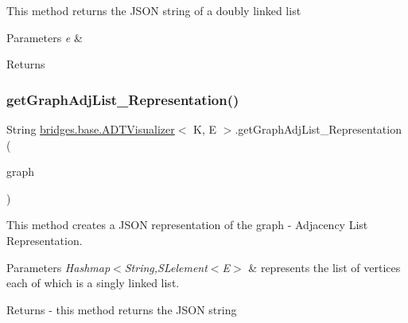 This method returns the J\+S\+ON string of a doubly linked list 
\begin{DoxyParams}{Parameters}
{\em e} & \\
\hline
\end{DoxyParams}
\begin{DoxyReturn}{Returns}

\end{DoxyReturn}
\hypertarget{classbridges_1_1base_1_1_a_d_t_visualizer_a0b923e3a1afd3d56b5c42ef39e4c5542}{}\label{classbridges_1_1base_1_1_a_d_t_visualizer_a0b923e3a1afd3d56b5c42ef39e4c5542} 
\subsubsection{\texorpdfstring{get\+Graph\+Adj\+List\+\_\+\+Representation()}{getGraphAdjList\_Representation()}}
{\footnotesize\ttfamily String \hyperlink{classbridges_1_1base_1_1_a_d_t_visualizer}{bridges.\+base.\+A\+D\+T\+Visualizer}$<$ K, E $>$.get\+Graph\+Adj\+List\+\_\+\+Representation (\begin{DoxyParamCaption}\item[{\hyperlink{classbridges_1_1base_1_1_graph_adj_list}{Graph\+Adj\+List}$<$ K, E $>$}]{graph }\end{DoxyParamCaption})}

This method creates a J\+S\+ON representation of the graph -\/ Adjacency List Representation. 
\begin{DoxyParams}{Parameters}
{\em Hashmap$<$\+String,S\+Lelement$<$\+E$>$} & represents the list of vertices each of which is a singly linked list. \\
\hline
\end{DoxyParams}
\begin{DoxyReturn}{Returns}
-\/ this method returns the J\+S\+ON string 
\end{DoxyReturn}
\hypertarget{classbridges_1_1base_1_1_a_d_t_visualizer_a7e3ecfc9522596bd12f0adef694eacf2}{}\label{classbridges_1_1base_1_1_a_d_t_visualizer_a7e3ecfc9522596bd12f0adef694eacf2} 
